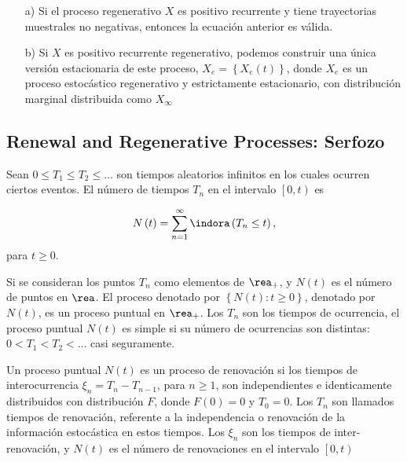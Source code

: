\begin{Note}
\begin{itemize}
\item[a)] Si el proceso regenerativo $X$ es positivo recurrente y tiene trayectorias muestrales no negativas, entonces la ecuaci\'on anterior es v\'alida.
\item[b)] Si $X$ es positivo recurrente regenerativo, podemos construir una \'unica versi\'on estacionaria de este proceso, $X_{e}=\left\{X_{e}\left(t\right)\right\}$, donde $X_{e}$ es un proceso estoc\'astico regenerativo y estrictamente estacionario, con distribuci\'on marginal distribuida como $X_{\infty}$
\end{itemize}
\end{Note}

\subsection{Renewal and Regenerative Processes: Serfozo\cite{Serfozo}}
\begin{Def}\label{Def.Tn}
Sean $0\leq T_{1}\leq T_{2}\leq \ldots$ son tiempos aleatorios infinitos en los cuales ocurren ciertos eventos. El n\'umero de tiempos $T_{n}$ en el intervalo $\left[0,t\right)$ es

\begin{eqnarray}
N\left(t\right)=\sum_{n=1}^{\infty}\indora\left(T_{n}\leq t\right),
\end{eqnarray}
para $t\geq0$.
\end{Def}

Si se consideran los puntos $T_{n}$ como elementos de $\rea_{+}$, y $N\left(t\right)$ es el n\'umero de puntos en $\rea$. El proceso denotado por $\left\{N\left(t\right):t\geq0\right\}$, denotado por $N\left(t\right)$, es un proceso puntual en $\rea_{+}$. Los $T_{n}$ son los tiempos de ocurrencia, el proceso puntual $N\left(t\right)$ es simple si su n\'umero de ocurrencias son distintas: $0<T_{1}<T_{2}<\ldots$ casi seguramente.

\begin{Def}
Un proceso puntual $N\left(t\right)$ es un proceso de renovaci\'on si los tiempos de interocurrencia $\xi_{n}=T_{n}-T_{n-1}$, para $n\geq1$, son independientes e identicamente distribuidos con distribuci\'on $F$, donde $F\left(0\right)=0$ y $T_{0}=0$. Los $T_{n}$ son llamados tiempos de renovaci\'on, referente a la independencia o renovaci\'on de la informaci\'on estoc\'astica en estos tiempos. Los $\xi_{n}$ son los tiempos de inter-renovaci\'on, y $N\left(t\right)$ es el n\'umero de renovaciones en el intervalo $\left[0,t\right)$
\end{Def}


